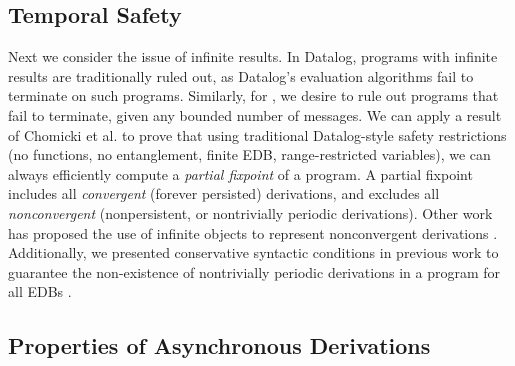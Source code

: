 
%
%
%

\subsection{Temporal Safety}

Next we consider the issue of infinite results.  In Datalog, programs with infinite results are traditionally ruled out, as Datalog's evaluation algorithms fail to terminate on such programs.  Similarly, for \lang, we desire to rule out programs that fail to terminate, given any bounded number of messages.  We can apply a result of Chomicki et al.  to prove that using traditional Datalog-style safety restrictions (no functions, no entanglement, finite EDB, range-restricted variables), we can always efficiently compute a {\em partial fixpoint} of a \lang program.  A partial fixpoint includes all {\em convergent} (forever persisted) derivations, and excludes all {\em nonconvergent} (nonpersistent, or nontrivially periodic derivations).  Other work has proposed the use of infinite objects to represent nonconvergent derivations .  Additionally, we  presented conservative syntactic conditions in previous work to guarantee the non-existence of nontrivially periodic derivations in a program for all EDBs .

\subsection{Properties of Asynchronous Derivations}

